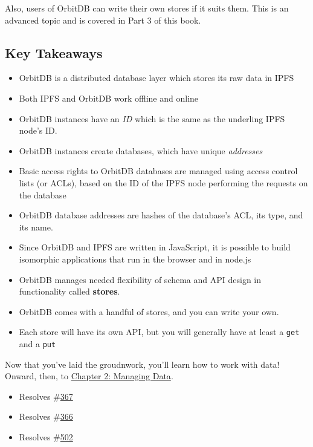 Also, users of OrbitDB can write their own stores if it suits them. This
is an advanced topic and is covered in Part 3 of this book.

\hypertarget{key-takeaways}{\subsection{Key
Takeaways}\label{key-takeaways}}

\begin{itemize}
\tightlist
\item
  OrbitDB is a distributed database layer which stores its raw data in
  IPFS
\item
  Both IPFS and OrbitDB work offline and online
\item
  OrbitDB instances have an \emph{ID} which is the same as the underling
  IPFS node's ID.
\item
  OrbitDB instances create databases, which have unique \emph{addresses}
\item
  Basic access rights to OrbitDB databases are managed using access
  control lists (or ACLs), based on the ID of the IPFS node performing
  the requests on the database
\item
  OrbitDB database addresses are hashes of the database's ACL, its type,
  and its name.
\item
  Since OrbitDB and IPFS are written in JavaScript, it is possible to
  build isomorphic applications that run in the browser and in node.js
\item
  OrbitDB manages needed flexibility of schema and API design in
  functionality called \textbf{stores}.
\item
  OrbitDB comes with a handful of stores, and you can write your own.
\item
  Each store will have its own API, but you will generally have at least
  a \texttt{get} and a \texttt{put}
\end{itemize}

Now that you've laid the groudnwork, you'll learn how to work with data!
Onward, then, to \href{./02_Managing_Data.md}{Chapter 2: Managing Data}.

\begin{itemize}
\tightlist
\item
  Resolves \#\href{https://github.com/orbitdb/orbit-db/issues/367}{367}
\item
  Resolves \#\href{https://github.com/orbitdb/orbit-db/issues/366}{366}
\item
  Resolves \#\href{https://github.com/orbitdb/orbit-db/issues/502}{502}
\end{itemize}

